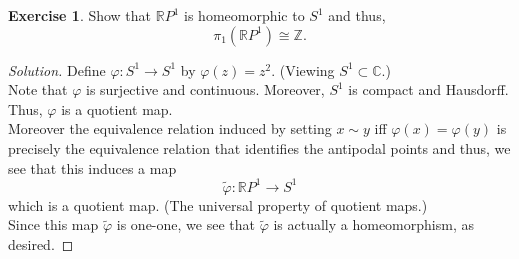 \documentclass[12pt]{article}
\theoremstyle{definition}
\numberwithin{thm}{section}
\newtheorem{exe}[thm]{Exercise}
\newenvironment{soln}{\begin{proof}[Solution]}{\end{proof}}
\begin{document}
\begin{exe} \label{exe:RP1isS1}
	Show that $\mathbb{R}P^1$ is homeomorphic to $S^1$ and thus, 
	\begin{equation*} 
		\pi_1(\mathbb{R}P^1) \cong \mathbb{Z}.
	\end{equation*}
\end{exe}
\begin{soln}
	Define $\varphi:S^1 \to S^1$ by $\varphi(z) = z^2.$ (Viewing $S^1 \subset \mathbb{C}.$) \\
	Note that $\varphi$ is surjective and continuous. Moreover, $S^1$ is compact and Hausdorff. Thus, $\varphi$ is a quotient map. \\
	Moreover the equivalence relation induced by setting $x \sim y$ iff $\varphi(x) = \varphi(y)$ is precisely the equivalence relation that identifies the antipodal points and thus, we see that this induces a map
	\begin{equation*} 
		\tilde{\varphi}:\mathbb{R}P^1 \to S^1
	\end{equation*}
	which is a quotient map. (The universal property of quotient maps.)\\
	Since this map $\tilde{\varphi}$ is one-one, we see that $\tilde{\varphi}$ is actually a homeomorphism, as desired.
\end{soln}
\end{document}
